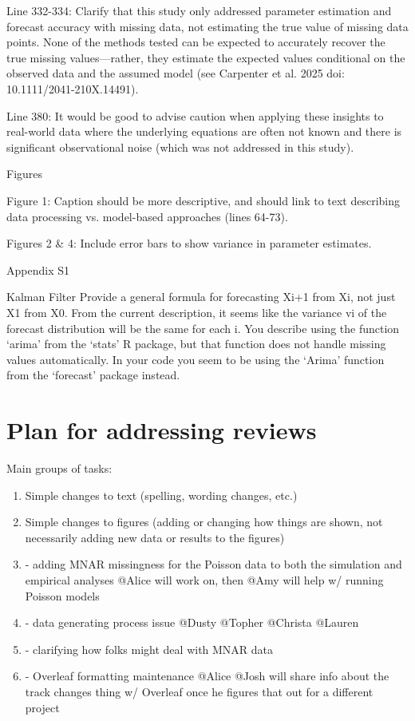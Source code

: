 \documentclass{article}
\begin{document}
Line 332-334: Clarify that this study only addressed parameter estimation and forecast accuracy with missing data, not estimating the true value of missing data points. None of the methods tested can be expected to accurately recover the true missing values—rather, they estimate the expected values conditional on the observed data and the assumed model (see Carpenter et al. 2025 doi: 10.1111/2041-210X.14491).

Line 380: It would be good to advise caution when applying these insights to real-world data where the underlying equations are often not known and there is significant observational noise (which was not addressed in this study).

Figures

Figure 1: Caption should be more descriptive, and should link to text describing data processing vs. model-based approaches (lines 64-73).

Figures 2 & 4: Include error bars to show variance in parameter estimates.


Appendix S1

Kalman Filter
        Provide a general formula for forecasting Xi+1 from Xi, not just X1 from X0. From the current description, it seems like the variance vi of the forecast distribution will be the same for each i.
        You describe using the function ‘arima’ from the ‘stats’ R package, but that function does not handle missing values automatically. In your code you seem to be using the ‘Arima’ function from the ‘forecast’ package instead.

\section{Plan for addressing reviews}
Main groups of tasks: 
\begin{enumerate}
    \item Simple changes to text (spelling, wording changes, etc.)
    \item Simple changes to figures (adding or changing how things are shown, not necessarily adding new data or results to the figures) 
    \item - adding MNAR missingness for the Poisson data to both the simulation and empirical analyses @Alice will work on, then @Amy will help w/ running Poisson models 
    \item - data generating process issue @Dusty @Topher @Christa @Lauren
    \item - clarifying how folks might deal with MNAR data 
    \item - Overleaf formatting maintenance @Alice @Josh will share info about the track changes thing w/ Overleaf once he figures that out for a different project 
\end{enumerate}
\end{document}
